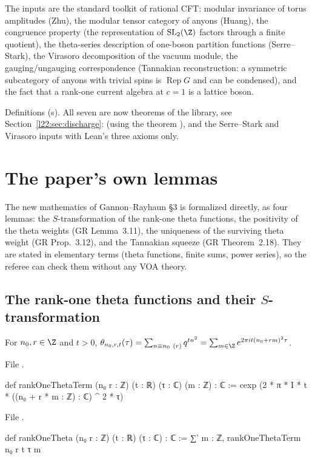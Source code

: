 \begin{physics}
The inputs are the standard toolkit of rational CFT: modular invariance of torus amplitudes (Zhu), the
modular tensor category of anyons (Huang), the congruence property (the representation of $\ltwotwoSL$ factors
through a finite quotient), the theta-series description of one-boson partition functions (Serre--Stark),
the Virasoro decomposition of the vacuum module, the gauging/ungauging correspondence (Tannakian
reconstruction: a symmetric subcategory of anyons with trivial spins is $\operatorname{Rep}G$ and can be
condensed), and the fact that a rank-one current algebra at $c=1$ is a lattice boson.
\end{physics}

\begin{status}
Definitions (s). All seven are now theorems of the library, see
Section~\ref{l22:sec:discharge}:  (using the theorem ),  and the
Serre--Stark and Virasoro inputs with Lean's three axioms only.
\end{status}

\section{The paper's own lemmas}\label{l22:sec:core}

The new mathematics of Gannon--Rayhaun §3 is formalized directly, as four lemmas: the
$S$-transformation of the rank-one theta functions, the positivity of the theta weights (GR Lemma~3.11), the
uniqueness of the surviving theta weight (GR Prop.~3.12), and the Tannakian squeeze (GR Theorem~2.18). They are
stated in elementary terms (theta functions, finite sums, power series), so the referee can check them without any
VOA theory.

\subsection{The rank-one theta functions and their \texorpdfstring{$S$}{S}-transformation}

\begin{definition}\label{l22:def:theta}
For $n_0,r\in\Z$ and $t>0$,
$\theta_{n_0,r,t}(\tau)=\sum_{n\equiv n_0\ (r)} q^{tn^2}=\sum_{m\in\Z}e^{2\pi i t(n_0+rm)^2\tau}$.
\end{definition}
\noindent File .
\begin{leancode}
def rankOneThetaTerm (n₀ r : ℤ) (t : ℝ) (τ : ℂ) (m : ℤ) : ℂ :=
  cexp (2 * π * I * t * ((n₀ + r * m : ℤ) : ℂ) ^ 2 * τ)
\end{leancode}
\noindent File .
\begin{leancode}
def rankOneTheta (n₀ r : ℤ) (t : ℝ) (τ : ℂ) : ℂ :=
  ∑' m : ℤ, rankOneThetaTerm n₀ r t τ m
\end{leancode}

